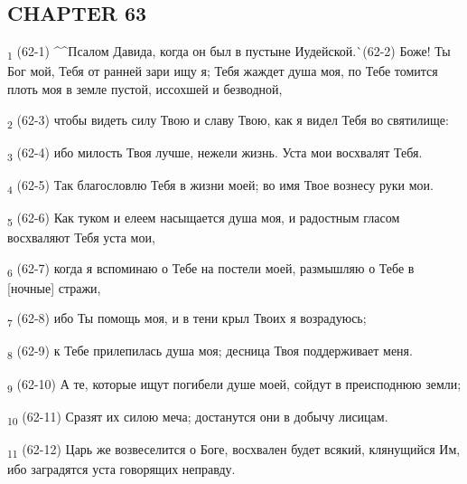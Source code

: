 \subsection{CHAPTER 63}
\begin{tcolorbox}
\textsubscript{1} (62-1) ^^Псалом Давида, когда он был в пустыне Иудейской.^^ (62-2) Боже! Ты Бог мой, Тебя от ранней зари ищу я; Тебя жаждет душа моя, по Тебе томится плоть моя в земле пустой, иссохшей и безводной,
\end{tcolorbox}
\begin{tcolorbox}
\textsubscript{2} (62-3) чтобы видеть силу Твою и славу Твою, как я видел Тебя во святилище:
\end{tcolorbox}
\begin{tcolorbox}
\textsubscript{3} (62-4) ибо милость Твоя лучше, нежели жизнь. Уста мои восхвалят Тебя.
\end{tcolorbox}
\begin{tcolorbox}
\textsubscript{4} (62-5) Так благословлю Тебя в жизни моей; во имя Твое вознесу руки мои.
\end{tcolorbox}
\begin{tcolorbox}
\textsubscript{5} (62-6) Как туком и елеем насыщается душа моя, и радостным гласом восхваляют Тебя уста мои,
\end{tcolorbox}
\begin{tcolorbox}
\textsubscript{6} (62-7) когда я вспоминаю о Тебе на постели моей, размышляю о Тебе в [ночные] стражи,
\end{tcolorbox}
\begin{tcolorbox}
\textsubscript{7} (62-8) ибо Ты помощь моя, и в тени крыл Твоих я возрадуюсь;
\end{tcolorbox}
\begin{tcolorbox}
\textsubscript{8} (62-9) к Тебе прилепилась душа моя; десница Твоя поддерживает меня.
\end{tcolorbox}
\begin{tcolorbox}
\textsubscript{9} (62-10) А те, которые ищут погибели душе моей, сойдут в преисподнюю земли;
\end{tcolorbox}
\begin{tcolorbox}
\textsubscript{10} (62-11) Сразят их силою меча; достанутся они в добычу лисицам.
\end{tcolorbox}
\begin{tcolorbox}
\textsubscript{11} (62-12) Царь же возвеселится о Боге, восхвален будет всякий, клянущийся Им, ибо заградятся уста говорящих неправду.
\end{tcolorbox}

